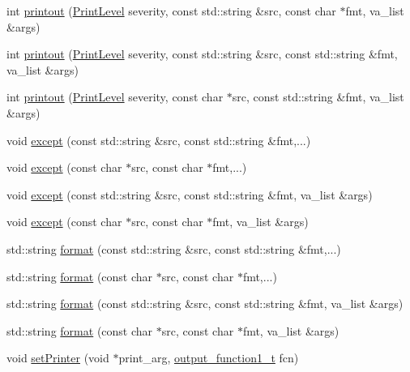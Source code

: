 \begin{DoxyCompactItemize}
\item 
int \hyperlink{namespace_d_d4hep_a3c8456e0ca02e7299e7bcd0480316eaa}{printout} (\hyperlink{namespace_d_d4hep_a5b5a64d56252469451f2020a27d57d42}{Print\+Level} severity, const std\+::string \&src, const char $\ast$fmt, va\+\_\+list \&args)
\item 
int \hyperlink{namespace_d_d4hep_a7cb4c929065e6f4c054748cfcdc90f9c}{printout} (\hyperlink{namespace_d_d4hep_a5b5a64d56252469451f2020a27d57d42}{Print\+Level} severity, const std\+::string \&src, const std\+::string \&fmt, va\+\_\+list \&args)
\item 
int \hyperlink{namespace_d_d4hep_a1ad7a8f6ac790c5d06c8dc2e2c9bf656}{printout} (\hyperlink{namespace_d_d4hep_a5b5a64d56252469451f2020a27d57d42}{Print\+Level} severity, const char $\ast$src, const std\+::string \&fmt, va\+\_\+list \&args)
\item 
void \hyperlink{namespace_d_d4hep_af8602b0b80e0c252cf28e5fbbc81abcc}{except} (const std\+::string \&src, const std\+::string \&fmt,...)
\item 
void \hyperlink{namespace_d_d4hep_a7fe7772a289c1e2eb3587ea99900827b}{except} (const char $\ast$src, const char $\ast$fmt,...)
\item 
void \hyperlink{namespace_d_d4hep_a4a02ec0c7a458f972986c141672a044c}{except} (const std\+::string \&src, const std\+::string \&fmt, va\+\_\+list \&args)
\item 
void \hyperlink{namespace_d_d4hep_a0ecfb76ddfb873affe80600e3d8912dd}{except} (const char $\ast$src, const char $\ast$fmt, va\+\_\+list \&args)
\item 
std\+::string \hyperlink{namespace_d_d4hep_a643d67cdbd95090fbcc93cdd3e4a8ad8}{format} (const std\+::string \&src, const std\+::string \&fmt,...)
\item 
std\+::string \hyperlink{namespace_d_d4hep_a6d0802d60cd32a48326f689ffedd4dfb}{format} (const char $\ast$src, const char $\ast$fmt,...)
\item 
std\+::string \hyperlink{namespace_d_d4hep_adf74a1091b13572f6d13c50fc56c3b39}{format} (const std\+::string \&src, const std\+::string \&fmt, va\+\_\+list \&args)
\item 
std\+::string \hyperlink{namespace_d_d4hep_a2d9fc6b33e6b8890a8974aa6ccee4b1c}{format} (const char $\ast$src, const char $\ast$fmt, va\+\_\+list \&args)
\item 
void \hyperlink{namespace_d_d4hep_a598efc9dd592c6ab1dd96be38bf5f9f8}{set\+Printer} (void $\ast$print\+\_\+arg, \hyperlink{namespace_d_d4hep_ae0b064bdf91daefc2e45293797f6780b}{output\+\_\+function1\+\_\+t} fcn)

\end{DoxyCompactItemize}
